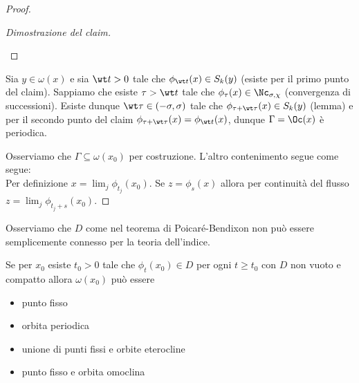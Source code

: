\begin{proof}
\begin{proof}[Dimostrazione del claim]
\begin{itemize}
\end{itemize}
\setlength{\leftmargini}{0.5cm}
\end{proof}
\noindent
Sia $y\in \omega(x)$ e sia $\wt t>0$ tale che $\phi_{\wt t}(x)\in S_k(y)$ (esiste per il primo punto del claim). Sappiamo che esiste $\tau>\wt t$ tale che $\phi_{\tau}(x)\in \Nc_{\sigma,\chi}$ (convergenza di successioni). Esiste dunque $\wt \tau\in (-\sigma,\sigma)$ tale che $\phi_{\tau+\wt \tau}(x)\in S_k(y)$ (lemma) e per il secondo punto del claim $\phi_{\tau+\wt\tau}(x)=\phi_{\wt t}(x)$, dunque $\Gamma=\Oc(x)$ \`e periodica.
\vspace{0.25cm}

\noindent
Osserviamo che $\Gamma\subseteq \omega(x_0)$ per costruzione. L'altro contenimento segue come segue:\\
Per definizione $x=\lim_j\phi_{t_j}(x_0)$. Se $z=\phi_{s}(x)$ allora per continuit\`a del flusso $z=\lim_j\phi_{t_j+s}(x_0)$.
\end{proof}

\begin{remark}
Osserviamo che $D$ come nel teorema di Poicar\'e-Bendixon non pu\`o essere semplicemente connesso per la teoria dell'indice.
\end{remark}

\begin{fact}
Se per $x_0$ esiste $t_0>0$ tale che $\phi_t(x_0)\in D$ per ogni $t\geq t_0$ con $D$ non vuoto e compatto allora $\omega(x_0)$ pu\`o essere
\begin{itemize}
\item punto fisso
\item orbita periodica
\item unione di punti fissi e orbite eterocline
\item punto fisso e orbita omoclina
\end{itemize}
\end{fact}

